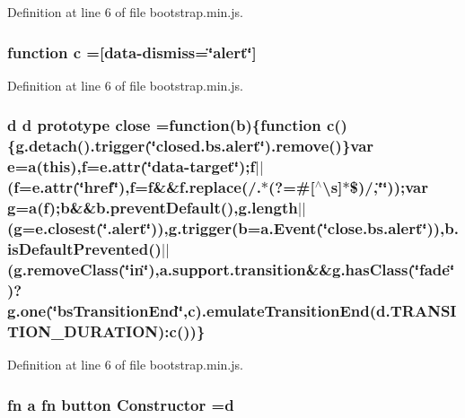 Definition at line 6 of file bootstrap.\+min.\+js.

\hypertarget{a00029_ad9d1ac02e33c4aed62ad517a7cb8b3fb}{}
\subsubsection[{c}]{\setlength{\rightskip}{0pt plus 5cm}function c =\textquotesingle{}\mbox{[}data-\/dismiss=\char`\"{}alert\char`\"{}\mbox{]}\textquotesingle{}}\label{a00029_ad9d1ac02e33c4aed62ad517a7cb8b3fb}


Definition at line 6 of file bootstrap.\+min.\+js.

\hypertarget{a00029_a72fbb3628c3cc943ced8aad64247888c}{}
\subsubsection[{close}]{ {\bf d} {\bf d} prototype close =function({\bf b})\{function {\bf c}()\{g.\+detach().trigger(\char`\"{}closed.\+bs.\+alert\char`\"{}).remove()\}var {\bf e}={\bf a}(this),f=e.\+attr(\char`\"{}data-\/target\char`\"{});f$\vert$$\vert$(f=e.\+attr(\char`\"{}href\char`\"{}),f=f\&\&f.\+replace(/.$\ast$(?=\#\mbox{[}$^\wedge$\textbackslash{}s\mbox{]}$\ast$\$)/,\char`\"{}\char`\"{}));var g={\bf a}(f);{\bf b}\&\&b.\+prevent\+Default(),g.\+length$\vert$$\vert$(g=e.\+closest(\char`\"{}.alert\char`\"{})),g.\+trigger({\bf b}=a.\+Event(\char`\"{}close.\+bs.\+alert\char`\"{})),b.\+is\+Default\+Prevented()$\vert$$\vert$(g.\+remove\+Class(\char`\"{}in\char`\"{}),a.\+support.\+transition\&\&{\bf g.\+has\+Class}(\char`\"{}fade\char`\"{})?g.\+one(\char`\"{}bs\+Transition\+End\char`\"{},c).{\bf emulate\+Transition\+End}({\bf d.\+T\+R\+A\+N\+S\+I\+T\+I\+O\+N\+\_\+\+D\+U\+R\+A\+T\+I\+O\+N})\+:{\bf c}())\}}\label{a00029_a72fbb3628c3cc943ced8aad64247888c}


Definition at line 6 of file bootstrap.\+min.\+js.

\hypertarget{a00029_a0545907c609a48549a0cf5d4c692f851}{}
\subsubsection[{Constructor}]{ {\bf fn} {\bf a} {\bf fn} {\bf button} Constructor ={\bf d}}\label{a00029_a0545907c609a48549a0cf5d4c692f851}


